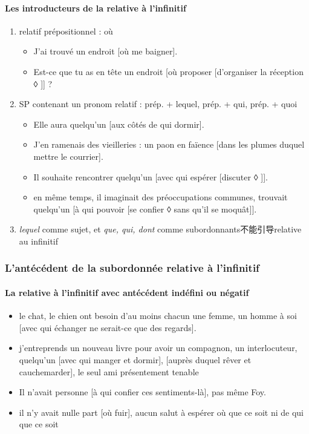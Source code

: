 \documentclass[UTF8]{report}
\begin{document}
\paragraph{Les introducteurs de la relative à l’infinitif}
\begin{enumerate}
    \item relatif prépositionnel : où
    \begin{itemize}
        \item J’ai trouvé un endroit [où me baigner].
        \item Est-ce que tu as en tête un endroit [où proposer [d’organiser la réception ◊ ]] ?
    \end{itemize}
    \item SP contenant un pronom relatif : prép. + lequel, prép. + qui, prép. + quoi
    \begin{itemize}
        \item Elle aura quelqu’un [aux côtés de qui dormir].
        \item J’en ramenais des vieilleries : un paon en faïence [dans les plumes duquel mettre le courrier].
        \item Il souhaite rencontrer quelqu’un [avec qui espérer [discuter ◊ ]].
        \item en même temps, il imaginait des préoccupations communes, trouvait quelqu’un [à qui pouvoir [se confier ◊ sans qu’il se moquât]].
    \end{itemize}
    \item \textit{lequel} comme sujet, et \textit{que, qui, dont} comme subordonnants不能引导relative au infinitif
\end{enumerate}

\subsubsection{L’antécédent de la subordonnée relative à l’infinitif}
\paragraph{La relative à l’infinitif avec antécédent indéfini ou négatif}
\begin{itemize}
    \item le chat, le chien ont besoin d’au moins chacun une femme, un homme à soi [avec qui échanger ne serait-ce que des regards].
    \item j’entreprends un nouveau livre pour avoir un compagnon, un interlocuteur, quelqu’un [avec qui manger et dormir], [auprès duquel rêver et cauchemarder], le seul ami présentement tenable
    \item Il n’avait personne [à qui confier ces sentiments-là], pas même Foy.
    \item il n’y avait nulle part [où fuir], aucun salut à espérer où que ce soit ni de qui que ce soit
\end{itemize}
\end{document}
